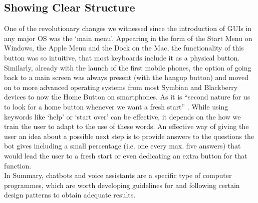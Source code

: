 \subsection*{Showing Clear Structure}
One of the revolutionary changes we witnessed since the introduction of GUIs in any major OS was the `main menu'. Appearing in the form of the Start Menu on Windows, the Apple Menu and the Dock on the Mac, the functionality of this button was so intuitive, that most keyboards include it as a physical button. Similarly, already with the launch of the first mobile phones, the option of going back to a main screen was always present (with the hangup button) and moved on to more advanced operating systems from most Symbian and Blackberry devices to now the Home Button on smartphones. As it is ``second nature for us to look for a home button whenever we want a fresh start'' \cite{uxbot}. While using keywords like `help' or `start over' can be effective, it depends on the how we train the user to adapt to the use of these words.
An effective way of giving the user an idea about a possible next step is to provide answers to the questions the bot gives including a small percentage (i.e. one every max. five answers) that would lead the user to a fresh start or even dedicating an extra button for that function.
\\


In Summary, chatbots and voice assistants are a specific type of computer programmes, which are worth developing guidelines for and following certain design patterns to obtain adequate results.
